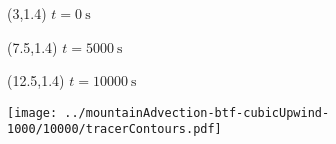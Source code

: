 \documentclass{article}
\begin{document}
\TPMargin{1pt}
\begin{textblock}{4}(3,1.4)
\normalsize
$t = \SI{0}{\second}$
\end{textblock}
\begin{textblock}{4}(7.5,1.4)
\normalsize
$t = \SI{5000}{\second}$
\end{textblock}
\begin{textblock}{4}(12.5,1.4)
\normalsize
$t = \SI{10000}{\second}$
\end{textblock}
\texttt{[image: ../mountainAdvection-btf-cubicUpwind-1000/10000/tracerContours.pdf]}
\end{document}
